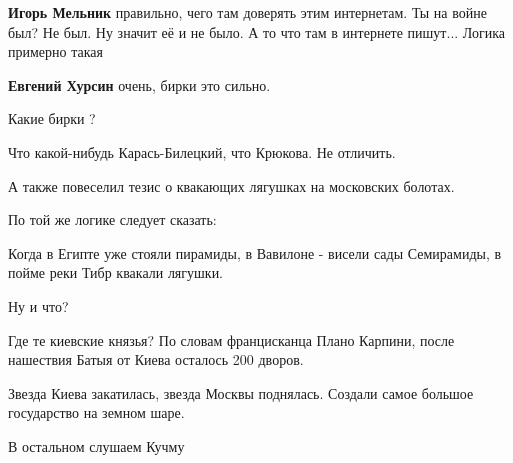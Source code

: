\begin{itemize}
\begin{itemize}
\textbf{Игорь Мельник} правильно, чего там доверять этим интернетам. Ты на войне был? Не был. Ну значит её и не было. А то что там в интернете пишут... Логика примерно такая

 
\textbf{Евгений Хурсин} очень, бирки это сильно.

 
Какие бирки ?

\end{itemize}

 
Что какой-нибудь Карась-Билецкий, что Крюкова. Не отличить.

 

А также повеселил тезис о квакающих лягушках на московских болотах.

По той же логике следует сказать:

Когда в Египте уже стояли пирамиды, в Вавилоне - висели сады Семирамиды, в
пойме реки Тибр квакали лягушки.

Ну и что?

Где те киевские князья? По словам францисканца Плано Карпини, после нашествия
Батыя от Киева осталось 200 дворов.

Звезда Киева закатилась, звезда Москвы поднялась. Создали самое большое
государство на земном шаре.

В остальном слушаем Кучму

 


\end{itemize}
